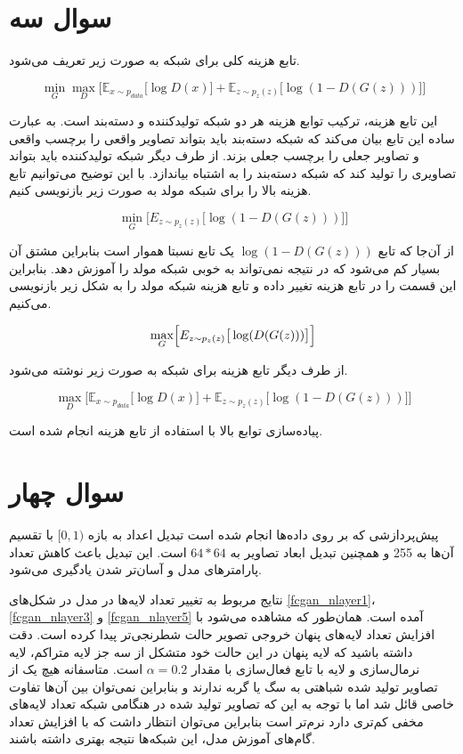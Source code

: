 \documentclass[12pt, a4paper]{book}
\begin{document}
\clearpage

\section*{سوال سه}

تابع هزینه کلی برای شبکه  به صورت زیر تعریف می‌شود.

$$\min_G \max_D \Big[\mathbb{E}_{x \sim p_{data}} \big[\log D(x)\big] + \mathbb{E}_{z \sim p_{z}(z)}\big[\log(1-D(G(z)))\big]\Big]$$

این تابع هزینه، ترکیب توابع هزینه هر دو شبکه تولیدکننده و دسته‌بند است. به عبارت ساده این تابع بیان می‌کند که
شبکه دسته‌بند باید بتواند تصاویر واقعی را برچسب واقعی و تصاویر جعلی را برچسب جعلی بزند. از طرف دیگر شبکه
تولیدکننده باید بتواند تصاویری را تولید کند که شبکه دسته‌بند را به اشتباه بیاندازد. با این توضیح می‌توانیم تابع
هزینه بالا را برای شبکه مولد به صورت زیر بازنویسی کنیم.

$$\min_G \Big[E_{z \sim p_z(z)}\big[\log(1-D(G(z)))\big]\Big]$$

از آن‌جا که تابع $\log(1-D(G(z)))$ یک تابع نسبتا هموار است بنابراین مشتق آن بسیار کم می‌شود که در نتیجه
نمی‌تواند به خوبی شبکه مولد را آموزش دهد. بنابراین این قسمت را در تابع هزینه تغییر داده و تابع هزینه شبکه
مولد را به شکل زیر بازنویسی می‌کنیم.

$$\max_G \Bigl[E_{z \sim p_z(z)}\big[\log(D(G(z)))\big]\Bigr]$$

از طرف دیگر تابع هزینه برای شبکه به صورت زیر نوشته می‌شود.

$$\max_D \Big[\mathbb{E}_{x \sim p_{data}} \big[\log D(x)\big] + \mathbb{E}_{z \sim p_{z}(z)}\big[\log(1-D(G(z)))\big]\Big]$$

پیاده‌سازی توابع بالا با استفاده از تابع هزینه  انجام شده است.

\section*{سوال چهار}

پیش‌پردازشی که بر روی داده‌ها انجام شده است تبدیل اعداد به بازه $[0,1)$ با تقسیم آن‌ها به 255 و همچنین
تبدیل ابعاد تصاویر به $64*64$ است. این تبدیل باعث کاهش تعداد پارامتر‌های مدل و آسان‌تر شدن یادگیری می‌شود.

نتایج مربوط به تغییر تعداد لایه‌ها در مدل  در شکل‌های \ref{fcgan_nlayer1}، \ref{fcgan_nlayer3} و
\ref{fcgan_nlayer5} آمده است. همان‌طور که مشاهده می‌شود با افزایش تعداد لایه‌های پنهان خروجی تصویر حالت
شطرنجی‌تر پیدا کرده است. دقت داشته باشید که لایه پنهان در این حالت خود متشکل از سه جز لایه متراکم، لایه نرمال‌سازی و
لایه با تابع فعال‌سازی  با مقدار $\alpha=0.2$ است.
متاسفانه هیچ یک از تصاویر تولید شده شباهتی به سگ یا گربه ندارند و بنابراین نمی‌توان
بین آن‌ها تفاوت خاصی قائل شد اما با توجه به این که تصاویر تولید شده در هنگامی شبکه تعداد لایه‌های مخفی کم‌تری دارد
نرم‌تر است بنابراین می‌توان انتظار داشت که با افزایش تعداد گام‌های آموزش مدل، این شبکه‌ها نتیجه بهتری داشته باشند.
\end{document}
